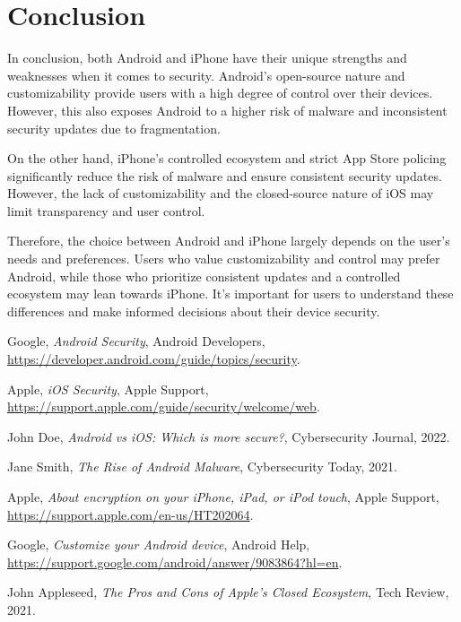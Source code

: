 \documentclass[11pt]{article}
\begin{document}
\section{Conclusion}

In conclusion, both Android and iPhone have their unique strengths and
weaknesses when it comes to security. Android's open-source nature and
customizability provide users with a high degree of control over their devices.
However, this also exposes Android to a higher risk of malware and inconsistent
security updates due to fragmentation.

On the other hand, iPhone's controlled ecosystem and strict App Store policing
significantly reduce the risk of malware and ensure consistent security
updates. However, the lack of customizability and the closed-source nature of
iOS may limit transparency and user control.

Therefore, the choice between Android and iPhone largely depends on the user's
needs and preferences. Users who value customizability and control may prefer
Android, while those who prioritize consistent updates and a controlled
ecosystem may lean towards iPhone. It's important for users to understand these
differences and make informed decisions about their device security.

\clearpage

\begin{thebibliography}{9}

      Google,
      \textit{Android Security},
      Android Developers,
      \url{https://developer.android.com/guide/topics/security}.

      Apple,
      \textit{iOS Security},
      Apple Support,
      \url{https://support.apple.com/guide/security/welcome/web}.

      John Doe,
      \textit{Android vs iOS: Which is more secure?},
      Cybersecurity Journal,
      2022.

      Jane Smith,
      \textit{The Rise of Android Malware},
      Cybersecurity Today,
      2021.

      Apple,
      \textit{About encryption on your iPhone, iPad, or iPod touch},
      Apple Support,
      \url{https://support.apple.com/en-us/HT202064}.

      Google,
      \textit{Customize your Android device},
      Android Help,
      \url{https://support.google.com/android/answer/9083864?hl=en}.

      John Appleseed,
      \textit{The Pros and Cons of Apple's Closed Ecosystem},
      Tech Review,
      2021.

\end{thebibliography}
\end{document}
